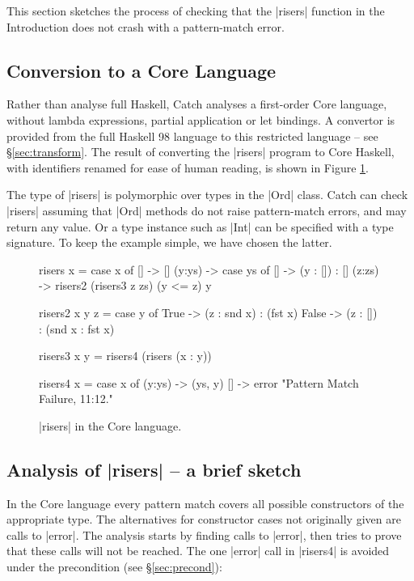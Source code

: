\documentclass[preprint]{sigplanconf}
\begin{document}
This section sketches the process of checking that the |risers| function in the Introduction does not crash with a pattern-match error.


\subsection{Conversion to a Core Language}

Rather than analyse full Haskell, Catch analyses a first-order Core language, without lambda expressions, partial application or let bindings. A convertor is provided from the full Haskell 98 language to this restricted language -- see \S\ref{sec:transform}. The result of converting the |risers| program to Core Haskell, with identifiers renamed for ease of human reading, is shown in Figure \ref{fig:risers_core}.

The type of |risers| is polymorphic over types in the |Ord| class. Catch can check |risers| assuming that |Ord| methods do not raise pattern-match errors, and may return any value. Or a type instance such as |Int| can be specified with a type signature. To keep the example simple, we have chosen the latter.

\begin{figure}
\begin{code}
risers x = case x of
    [] -> []
    (y:ys) ->  case ys of
         [] -> (y : []) : []
         (z:zs) -> risers2 (risers3 z zs) (y <= z) y

risers2 x y z =  case y of
    True -> (z : snd x) : (fst x)
    False -> (z : []) : (snd x : fst x)

risers3 x y = risers4 (risers (x : y))

risers4 x = case x of
    (y:ys) -> (ys, y)
    [] -> error "Pattern Match Failure, 11:12."
\end{code}
\caption{|risers| in the Core language.}
\label{fig:risers_core}
\end{figure}

\subsection{Analysis of |risers| -- a brief sketch}

In the Core language every pattern match covers all possible constructors of the appropriate type. The alternatives for constructor cases not originally given are calls to |error|. The analysis starts by finding calls to |error|, then tries to prove that these calls will not be reached. The one |error| call in |risers4| is avoided under the precondition (see \S\ref{sec:precond}):
\end{document}
